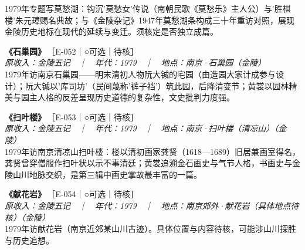\documentclass[UTF8,fontset=none,zihao=-4,a4paper]{ctexart}
\begin{document}
1979年专题写莫愁湖：钩沉'莫愁女'传说（南朝民歌《莫愁乐》主人公）与'胜棋楼'朱元璋赐名典故；与《金陵杂记》1947年莫愁湖条构成三十年重访对照，展现金陵历史地标在现代的延续与变迁。须核定是否独立成篇。
\par\vspace{5pt}
\noindent\textbf{《石巢园》}\,{\small ［E-052｜○可选｜待核］}\\
{\small\itshape 原收入：金陵五记　｜　年代：1979　｜　地点：南京·石巢园（金陵）}\\
1979年访南京石巢园——明末清初人物阮大铖的宅园（由造园大家计成参与设计）；阮大铖以'库司坊'（民间蔑称'裤子裆'）筑此园，后降清变节；黄裳以园林精美与园主人格的反差呈现历史道德的复杂性，文史批判力度强。
\par\vspace{5pt}
\noindent\textbf{《扫叶楼》}\,{\small ［E-053｜○可选｜待核］}\\
{\small\itshape 原收入：金陵五记　｜　年代：1979　｜　地点：南京·扫叶楼（清凉山）（金陵）}\\
1979年访南京清凉山扫叶楼：楼以清初画家龚贤（1618—1689）旧居兼画室得名，龚贤曾穿僧服作扫叶状以示不事清廷；黄裳追溯金石画史与气节人格，书画史与金陵山川地脉交织，是第三辑中画史掌故最丰富的一篇。
\par\vspace{5pt}
\noindent\textbf{《献花岩》}\,{\small ［E-054｜○可选｜待核］}\\
{\small\itshape 原收入：金陵五记　｜　年代：1979　｜　地点：南京郊外·献花岩（具体地点待核）（金陵）}\\
1979年访献花岩（南京近郊某山川古迹）。具体位置与内容待核，可能涉山川探胜与历史追想。
\par\vspace{5pt}
\end{document}
